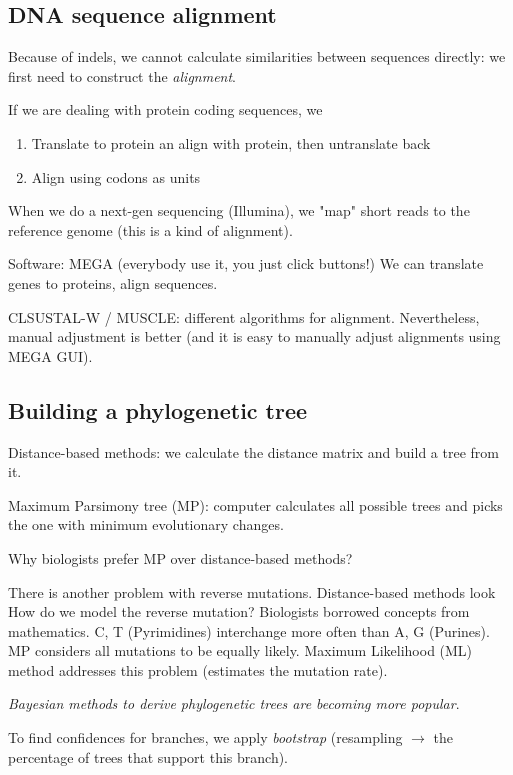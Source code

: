 \documentclass[main.tex]{subfiles}
\begin{document}
\subsection{DNA sequence alignment}

Because of indels, we cannot calculate similarities between sequences directly: we first need to construct the \emph{alignment}.

If we are dealing with protein coding sequences, we
\begin{enumerate}[noitemsep]
	\item Translate to protein an align with protein, then untranslate back
	\item Align using codons as units 
\end{enumerate}

When we do a next-gen sequencing (Illumina), we "map" short reads to the reference genome (this is a kind of alignment).

Software: MEGA (everybody use it, you just click buttons!)
We can translate genes to proteins, align sequences.

CLSUSTAL-W / MUSCLE: different algorithms for alignment.
Nevertheless, manual adjustment is better (and it is easy to manually adjust alignments using MEGA GUI).

\subsection{Building a phylogenetic tree}

Distance-based methods: we calculate the distance matrix and build a tree from it.

Maximum Parsimony tree (MP): computer calculates all possible trees and picks the one with minimum evolutionary changes.

Why biologists prefer MP over distance-based methods?

There is another problem with reverse mutations.
Distance-based methods look
How do we model the reverse mutation?
Biologists borrowed concepts from mathematics.
C, T (Pyrimidines) interchange more often than A, G (Purines).
MP considers all mutations to be equally likely.
Maximum Likelihood (ML) method addresses this problem (estimates the mutation rate).

\emph{Bayesian methods to derive phylogenetic trees are becoming more popular}.

To find confidences for branches, we apply \emph{bootstrap} (resampling $ \rightarrow $ the percentage of trees that support this branch).
\end{document}
